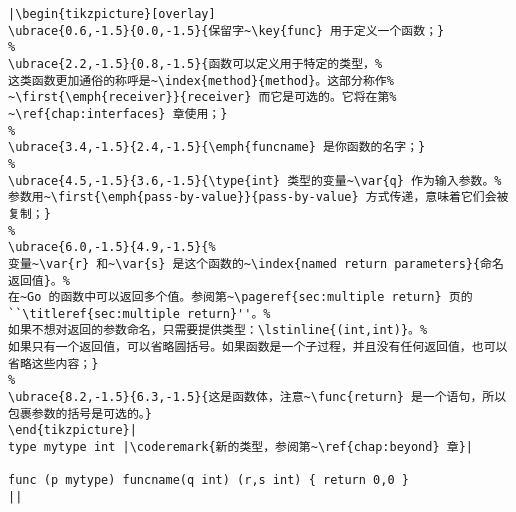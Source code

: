 \begin{lstlisting}[caption=函数定义,label=src:function definition]
|\begin{tikzpicture}[overlay]
\ubrace{0.6,-1.5}{0.0,-1.5}{保留字~\key{func} 用于定义一个函数；}
%
\ubrace{2.2,-1.5}{0.8,-1.5}{函数可以定义用于特定的类型，%
这类函数更加通俗的称呼是~\index{method}{method}。这部分称作%
~\first{\emph{receiver}}{receiver} 而它是可选的。它将在第%
~\ref{chap:interfaces} 章使用；}
%
\ubrace{3.4,-1.5}{2.4,-1.5}{\emph{funcname} 是你函数的名字；}
%
\ubrace{4.5,-1.5}{3.6,-1.5}{\type{int} 类型的变量~\var{q} 作为输入参数。%
参数用~\first{\emph{pass-by-value}}{pass-by-value} 方式传递，意味着它们会被复制；}
%
\ubrace{6.0,-1.5}{4.9,-1.5}{%
变量~\var{r} 和~\var{s} 是这个函数的~\index{named return parameters}{命名返回值}。%
在~Go 的函数中可以返回多个值。参阅第~\pageref{sec:multiple return} 页的``\titleref{sec:multiple return}''。%
如果不想对返回的参数命名，只需要提供类型：\lstinline{(int,int)}。%
如果只有一个返回值，可以省略圆括号。如果函数是一个子过程，并且没有任何返回值，也可以省略这些内容；}
%
\ubrace{8.2,-1.5}{6.3,-1.5}{这是函数体，注意~\func{return} 是一个语句，所以包裹参数的括号是可选的。}
\end{tikzpicture}|
type mytype int	|\coderemark{新的类型，参阅第~\ref{chap:beyond} 章}|

func (p mytype) funcname(q int) (r,s int) { return 0,0 }
||
\end{lstlisting}
